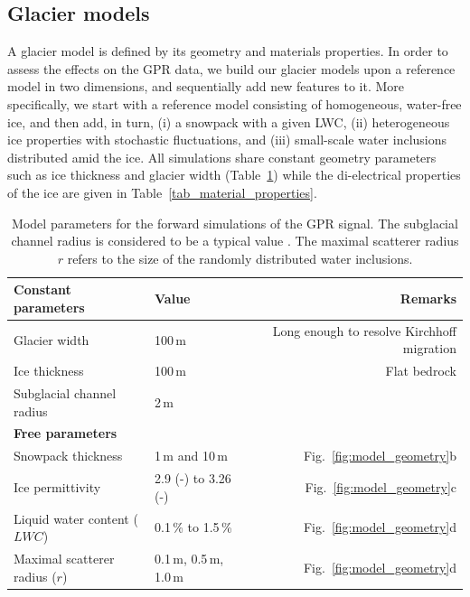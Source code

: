 \subsection{Glacier models}
\label{sec:glacier_materials}

A glacier model is defined by its geometry and materials properties. In order to assess the effects on the GPR data, we build our glacier models upon a reference model in two dimensions, and sequentially add new features to it. More specifically, we start with a reference model consisting of homogeneous, water-free ice, and then add, in turn, (i) a snowpack with a given LWC, (ii) heterogeneous ice properties with stochastic fluctuations, and (iii) small-scale water inclusions distributed amid the ice. All simulations share constant geometry parameters such as ice thickness and glacier width (Table~\ref{tab:simul_param}) while the di-electrical properties of the ice are given in Table~\ref{tab_material_properties}.

\begin{table}[H]
    \centering
\caption{Model parameters for the forward simulations of the GPR signal. The subglacial channel radius is considered to be a typical value \citep{Fountain&Walder1998, Cuffey&Paterson2010}. The maximal scatterer radius $r$ refers to the size of the randomly distributed water inclusions.}
    \begin{tabular}{l l r}
         \hline
\textbf{Constant parameters}  & \textbf{Value} & \textbf{Remarks} \\
\hline
Glacier width & 100\,m & Long enough to resolve Kirchhoff migration\\
Ice thickness & 100\,m & Flat bedrock \\
Subglacial channel radius & 2\,m & \\
\hline
\textbf{Free parameters}  &  &  \\
\hline
Snowpack thickness & 1\,m and 10\,m & Fig.~\ref{fig:model_geometry}b\\
Ice permittivity & 2.9 (-) to 3.26 (-) & Fig.~\ref{fig:model_geometry}c\\
Liquid water content ($LWC$) & 0.1\,\% to 1.5\,\% & Fig.~\ref{fig:model_geometry}d \\
Maximal scatterer radius ($r$) & 0.1\,m, 0.5\,m, 1.0\,m & Fig.~\ref{fig:model_geometry}d\\
\hline
    \end{tabular}
\label{tab:simul_param}
\end{table}

